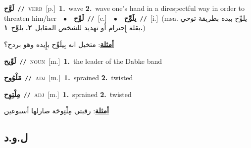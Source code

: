 \documentclass[10pt,a4paper,twoside]{article} %
\begin{document}
\begin{multicols}{2}
{\setlength\topsep{0pt}\textbf{\foreignlanguage{arabic}{لَوَّح}}\ {\color{gray}\texttt{//}\color{black}}\ \textsc{verb}\ [p.]\ \textbf{1.}~wave  \textbf{2.}~wave one's hand in a direspectful way in order to threaten him/her\ \ $\bullet$\ \ \setlength\topsep{0pt}\textbf{\foreignlanguage{arabic}{لَوِّح}}\ {\color{gray}\texttt{//}\color{black}}\ [c.]\ \ $\bullet$\ \ \setlength\topsep{0pt}\textbf{\foreignlanguage{arabic}{يلَوِّح}}\ {\color{gray}\texttt{//}\color{black}}\ [i.]\ \color{gray}(msa. \foreignlanguage{arabic}{يلوِّح بيده بطريقة توحي بقلة إِحترام أو تهديد للشخص المقابل}~\foreignlanguage{arabic}{\textbf{٢.}}  \foreignlanguage{arabic}{يلوِّح}~\foreignlanguage{arabic}{\textbf{١.}})\color{black}\  \begin{flushright}\color{gray}\foreignlanguage{arabic}{\textbf{\underline{\foreignlanguage{arabic}{أمثلة}}}: متخيل انه بِيلَوِّح بإِيده وهو بردح؟}\end{flushright}\color{black}} \vspace{2mm}

{\setlength\topsep{0pt}\textbf{\foreignlanguage{arabic}{لَوِّيح}}\ {\color{gray}\texttt{//}\color{black}}\ \textsc{noun}\ [m.]\ \textbf{1.}~the leader of the Dabke band\ } \vspace{2mm}

{\setlength\topsep{0pt}\textbf{\foreignlanguage{arabic}{مَلْوُوح}}\ {\color{gray}\texttt{//}\color{black}}\ \textsc{adj}\ [m.]\ \textbf{1.}~sprained  \textbf{2.}~twisted\ } \vspace{2mm}

{\setlength\topsep{0pt}\textbf{\foreignlanguage{arabic}{مِلْتِوِح}}\ {\color{gray}\texttt{//}\color{black}}\ \textsc{adj}\ [m.]\ \textbf{1.}~sprained  \textbf{2.}~twisted\  \begin{flushright}\color{gray}\foreignlanguage{arabic}{\textbf{\underline{\foreignlanguage{arabic}{أمثلة}}}: رقبتي مِلْتِوحَة صارلها أسبوعين}\end{flushright}\color{black}} \vspace{2mm}

\vspace{-3mm}
\subsection*{\color{blue}\foreignlanguage{arabic}{ل.و.د}\color{blue}{}} 


\end{multicols}
\end{document}
